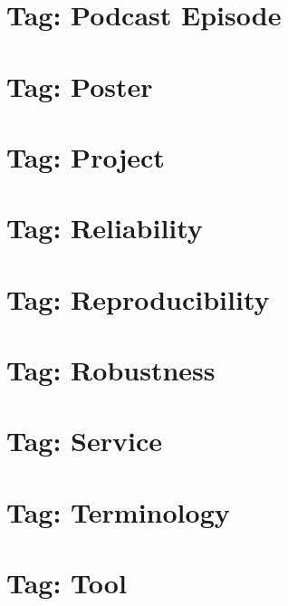 \documentclass[twoside]{book}
\newcommand{\+}{\discretionary{\mbox{\scriptsize$\hookleftarrow$}}{}{}}
\begin{document}
\chapter{Tag\+: Podcast Episode}
\label{md_markdown_tag_podcast-episode}

\chapter{Tag\+: Poster}
\label{md_markdown_tag_poster}

\chapter{Tag\+: Project}
\label{md_markdown_tag_project}

\chapter{Tag\+: Reliability}
\label{md_markdown_tag_reliability}

\chapter{Tag\+: Reproducibility}
\label{md_markdown_tag_reproducibility}

\chapter{Tag\+: Robustness}
\label{md_markdown_tag_robustness}

\chapter{Tag\+: Service}
\label{md_markdown_tag_service}

\chapter{Tag\+: Terminology}
\label{md_markdown_tag_terminology}

\chapter{Tag\+: Tool}
\label{md_markdown_tag_tool}

\end{document}
